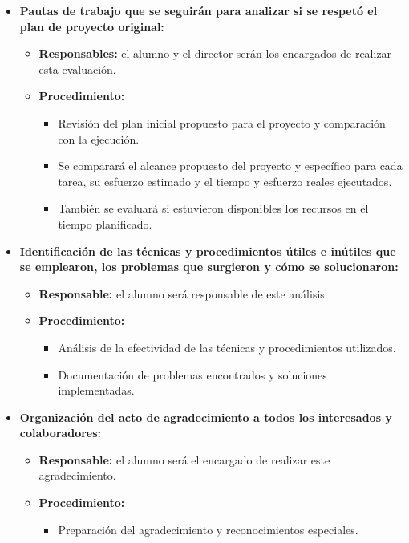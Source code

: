 \documentclass[
11pt, %
codirector, %
]{charter}
\begin{document}
\begin{itemize}
	\item \textbf{Pautas de trabajo que se seguirán para analizar si se respetó el plan de proyecto original:}
		\begin{itemize}
			\item \textbf{Responsables:} el alumno y el director serán los encargados de realizar esta evaluación.
			\item \textbf{Procedimiento:}
			\begin{itemize}
				\item Revisión del plan inicial propuesto para el proyecto y comparación con la ejecución.
				\item Se comparará el alcance propuesto del proyecto y específico para cada tarea, su esfuerzo estimado y el tiempo y esfuerzo reales ejecutados.
				\item También se evaluará si estuvieron disponibles los recursos en el tiempo planificado.
			\end{itemize}
		\end{itemize}

	\item \textbf{Identificación de las técnicas y procedimientos útiles e inútiles que se emplearon, los problemas que surgieron y cómo se solucionaron:}
		\begin{itemize}
			\item \textbf{Responsable:} el alumno será responsable de este análisis.
			\item \textbf{Procedimiento:}
			\begin{itemize}
				\item Análisis de la efectividad de las técnicas y procedimientos utilizados.
				\item Documentación de problemas encontrados y soluciones implementadas.
			\end{itemize}
		\end{itemize}

	\item \textbf{Organización del acto de agradecimiento a todos los interesados y colaboradores:}
		\begin{itemize}
			\item \textbf{Responsable:} el alumno será el encargado de realizar este agradecimiento.
			\item \textbf{Procedimiento:}
			\begin{itemize}
				\item Preparación del agradecimiento y reconocimientos especiales.
			\end{itemize}
		\end{itemize}
\end{itemize}
\end{document}
